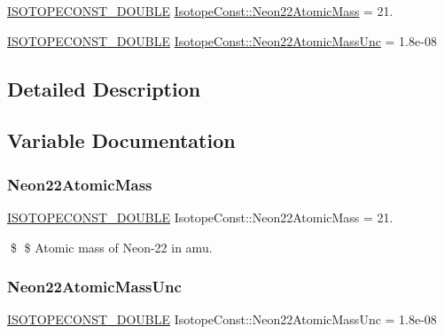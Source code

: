 \begin{DoxyCompactItemize}
\item 
\mbox{\hyperlink{group___isotope_const-_macros_ga8f45a7272ce02c0b4c65c44636ed719a}{I\+S\+O\+T\+O\+P\+E\+C\+O\+N\+S\+T\+\_\+\+D\+O\+U\+B\+LE}} \mbox{\hyperlink{group___isotope_const-_neon-_ne22_ga6e9e72b00c2e6e0b7fa4699ae4dc5b8f}{Isotope\+Const\+::\+Neon22\+Atomic\+Mass}} = 21.
\item 
\mbox{\hyperlink{group___isotope_const-_macros_ga8f45a7272ce02c0b4c65c44636ed719a}{I\+S\+O\+T\+O\+P\+E\+C\+O\+N\+S\+T\+\_\+\+D\+O\+U\+B\+LE}} \mbox{\hyperlink{group___isotope_const-_neon-_ne22_gaa6098dbed7aa397ba65bbbf7b2953065}{Isotope\+Const\+::\+Neon22\+Atomic\+Mass\+Unc}} = 1.\+8e-\/08
\end{DoxyCompactItemize}


\subsection{Detailed Description}


\subsection{Variable Documentation}
\mbox{\label{group___isotope_const-_neon-_ne22_ga6e9e72b00c2e6e0b7fa4699ae4dc5b8f}} 
\subsubsection{\texorpdfstring{Neon22\+Atomic\+Mass}{Neon22AtomicMass}}
{\footnotesize\ttfamily \mbox{\hyperlink{group___isotope_const-_macros_ga8f45a7272ce02c0b4c65c44636ed719a}{I\+S\+O\+T\+O\+P\+E\+C\+O\+N\+S\+T\+\_\+\+D\+O\+U\+B\+LE}} Isotope\+Const\+::\+Neon22\+Atomic\+Mass = 21.}

\$ \$ Atomic mass of Neon-\/22 in amu. \mbox{\label{group___isotope_const-_neon-_ne22_gaa6098dbed7aa397ba65bbbf7b2953065}} 
\subsubsection{\texorpdfstring{Neon22\+Atomic\+Mass\+Unc}{Neon22AtomicMassUnc}}
{\footnotesize\ttfamily \mbox{\hyperlink{group___isotope_const-_macros_ga8f45a7272ce02c0b4c65c44636ed719a}{I\+S\+O\+T\+O\+P\+E\+C\+O\+N\+S\+T\+\_\+\+D\+O\+U\+B\+LE}} Isotope\+Const\+::\+Neon22\+Atomic\+Mass\+Unc = 1.\+8e-\/08}

